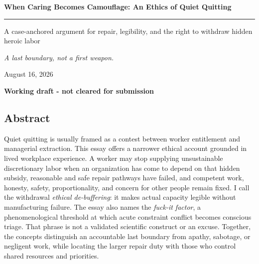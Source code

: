 \documentclass[12pt,oneside]{article}
\begin{document}
\hypersetup{pageanchor=false}

\begin{titlepage}
\thispagestyle{empty}
\vspace*{0.65in}

{\sffamily\bfseries\fontsize{26}{31}\selectfont\color{ManifestInk}
When Caring Becomes Camouflage: An Ethics of Quiet Quitting\par}

\vspace{0.5em}
{\color{ManifestRule}\rule{\textwidth}{1.2pt}}
\vspace{1.0em}

{\sffamily\fontsize{15}{20}\selectfont\color{ManifestGray}
A case-anchored argument for repair, legibility, and the right to
withdraw hidden heroic labor\par}

\vfill

\begin{tcolorbox}[
  enhanced,
  colback=ManifestLight,
  colframe=ManifestRule,
  boxrule=0pt,
  leftrule=4pt,
  arc=0pt,
  left=14pt,right=14pt,top=13pt,bottom=13pt
]
{\Large\itshape A last boundary, not a first weapon.}
\end{tcolorbox}
\vfill

{\sffamily\color{ManifestGray}August 16, 2026\par}
\vspace{0.4em}
{\sffamily\bfseries\color{ManifestGray}Working draft - not cleared for
submission\par}
\vspace{0.55in}
\end{titlepage}

\hypersetup{pageanchor=true}

\hypertarget{abstract}{%
\subsection{Abstract}\label{abstract}}

Quiet quitting is usually framed as a contest between worker entitlement
and managerial extraction. This essay offers a narrower ethical account
grounded in lived workplace experience. A worker may stop supplying
unsustainable discretionary labor when an organization has come to
depend on that hidden subsidy, reasonable and safe repair pathways have
failed, and competent work, honesty, safety, proportionality, and
concern for other people remain fixed. I call the withdrawal
\emph{ethical de-buffering}: it makes actual capacity legible without
manufacturing failure. The essay also names the \emph{fuck-it factor}, a
phenomenological threshold at which acute constraint conflict becomes
conscious triage. That phrase is not a validated scientific construct or
an excuse. Together, the concepts distinguish an accountable last
boundary from apathy, sabotage, or negligent work, while locating the
larger repair duty with those who control shared resources and
priorities.
\end{document}
